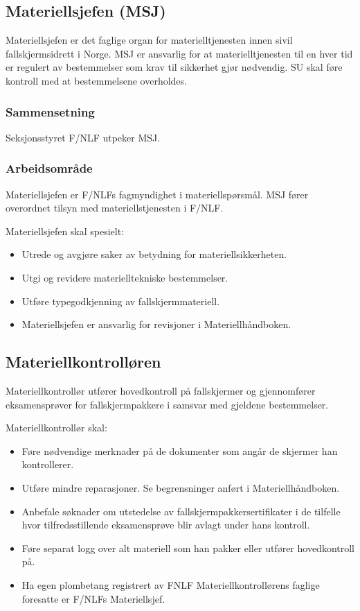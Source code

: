 \subsection{Materiellsjefen (MSJ)}
Materiellsjefen er det faglige organ for materielltjenesten innen sivil fallskjermsidrett i Norge. MSJ er ansvarlig for at materielltjenesten til en hver tid er regulert av bestemmelser som krav til sikkerhet gjør nødvendig. SU skal føre kontroll med at bestemmelsene overholdes.

\subsubsection{Sammensetning}
Seksjonsstyret F/NLF utpeker MSJ.

\subsubsection{Arbeidsområde}
Materiellsjefen er F/NLFs fagmyndighet i materiellspørsmål. MSJ fører overordnet tilsyn med materiellstjenesten i F/NLF.

Materiellsjefen skal spesielt:
\begin{itemize}
	\item Utrede og avgjøre saker av betydning for materiellsikkerheten.
	\item Utgi og revidere materielltekniske bestemmelser.
	\item Utføre typegodkjenning av fallskjermmateriell.
	\item Materiellsjefen er ansvarlig for revisjoner i Materiellhåndboken.
\end{itemize}

\subsection{Materiellkontrolløren}
Materiellkontrollør utfører hovedkontroll på fallskjermer og gjennomfører eksamensprøver for fallskjermpakkere i samsvar med gjeldene bestemmelser.

Materiellkontrollør skal:
\begin{itemize}
	\item Føre nødvendige merknader på de dokumenter som angår de skjermer han kontrollerer.
	\item Utføre mindre reparasjoner. Se begrensninger anført i Materiellhåndboken.
	\item Anbefale søknader om utstedelse av fallskjermpakkersertifikater i de tilfelle hvor tilfredsstillende eksamensprøve blir avlagt under hans kontroll.
	\item Føre separat logg over alt materiell som han pakker eller utfører hovedkontroll på.
	\item Ha egen plombetang registrert av FNLF Materiellkontrollørens faglige foresatte er F/NLFs Materiellsjef.
\end{itemize}

